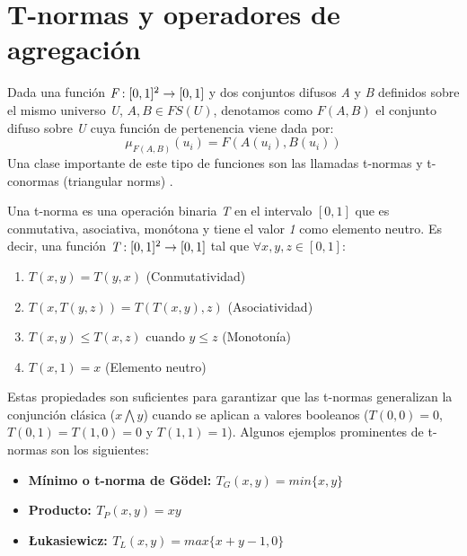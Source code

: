 \section{T-normas y operadores de agregación}\label{sec:t-norms-aggregation-operator}
Dada una función \begin{math}\emph{F}:[0,1]^2\rightarrow[0,1]\end{math} y dos conjuntos difusos \emph{A} y \emph{B} definidos sobre el mismo universo \emph{U}, \begin{math}A,B\in FS(U)\end{math}, denotamos como \begin{math}F(A,B)\end{math} el conjunto difuso sobre \emph{U} cuya función de pertenencia viene dada por:
\begin{equation}
\mu_{F(A,B)}(u_{i}) = F(A(u_{i}),B(u_{i}))
\end{equation}
Una clase importante de este tipo de funciones son las llamadas t-normas y t-conormas (triangular norms) \cite{klement2000triangular}.
\begin{definition}\label{def:tnorma}
Una t-norma es una operación binaria \emph{T} en el intervalo $[0,1]$ que es conmutativa, asociativa, monótona y tiene el valor \emph{1} como elemento neutro. Es decir, una función $\emph{T} : [0,1]^2 \rightarrow [0,1]$ tal que $\forall x,y,z \in [0,1]$:
\begin{enumerate}[label=(T\arabic*),ref=(T\arabic*)]
   \item $T(x,y) = T(y,x)$ (Conmutatividad)\label{T1}
   \item $T(x,T(y,z)) = T(T(x,y),z)$ (Asociatividad)\label{T2}
   \item $T(x,y) \leq T(x,z)$ cuando $y \leq z$ (Monotonía)\label{T3}
   \item $T(x,1) = x$ (Elemento neutro)\label{T4}
  \end{enumerate}
\end{definition}
Estas propiedades son suficientes para garantizar que las t-normas generalizan la conjunción clásica ($x\bigwedge y$) cuando se aplican a valores booleanos ($T(0,0)=0$,$T(0,1)=T(1,0)=0$ y $T(1,1)=1$).
Algunos ejemplos prominentes de t-normas son los siguientes:
\begin{itemize}
	\item \bfseries Mínimo o t-norma de Gödel: $T_{G}(x,y) = min\{x,y\}$
	\item \bfseries Producto: $T_{P}(x,y) = xy$
	\item \bfseries \L{}ukasiewicz: $T_{L}(x,y) = max\{x+y-1,0\}$
\end{itemize}
